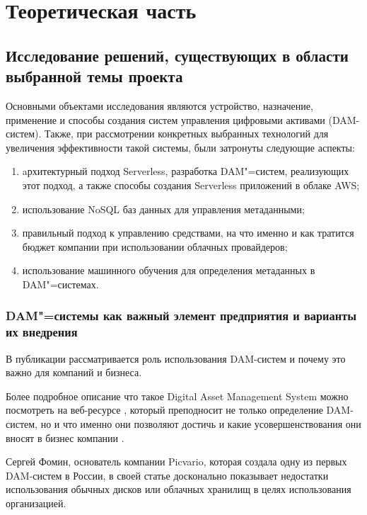 \clearpage
\chapter{Теоретическая часть}

\section{Исследование решений, существующих в области выбранной темы проекта}
Основными объектами исследования являются устройство, назначение, применение и способы создания систем управления цифровыми активами (DAM-систем). Также, при рассмотрении конкретных выбранных технологий для увеличения эффективности такой системы, были затронуты следующие аспекты: 
\begin{enumerate}
  \item aрхитектурный подход Serverless, разработка DAM"=систем, реализующих этот подход, а также способы создания Serverless приложений в облаке AWS; 
  \item использование NoSQL баз данных для управления метаданными;
  \item правильный подход к управлению средствами, на что именно и как тратится бюджет компании при использовании облачных провайдеров;
  \item использование машинного обучения для определения метаданных в DAM"=системах.
\end{enumerate}

\subsection{DAM"=системы как важный элемент предприятия и варианты их внедрения}
В публикации \cite{DamImpl} рассматривается роль использования DAM-систем и почему это важно для компаний и бизнеса.

Более подробное описание что такое Digital Asset Management System можно посмотреть на веб-ресурсе \cite{whatIsDamSys}, который преподносит не только определение DAM-систем, но и что именно они позволяют достичь и какие усовершенствования они вносят в бизнес компании \cite{DigitalAssetManagement}.

Сергей Фомин, основатель компании Picvario, которая создала одну из первых DAM-систем в России, в своей статье \cite{SergeyPhomin} досконально показывает недостатки использования обычных дисков или облачных хранилищ в целях использования организацией.


